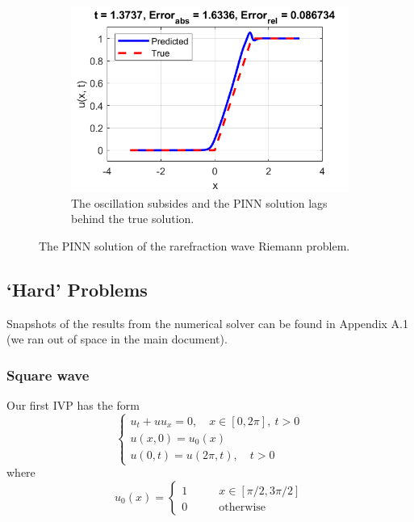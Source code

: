 \documentclass{myproject}
\begin{document}
\begin{figure}
\begin{subfigure}{.48\textwidth}
        \includegraphics[width=1\textwidth]{t137_NN_rarefraction.png}
        \caption{The oscillation subsides and the PINN solution lags behind the true solution.}
    \end{subfigure}
    \caption{The PINN solution of the rarefraction wave Riemann problem.}
\end{figure}








\subsection{`Hard' Problems}
Snapshots of the results from the numerical solver can be found in Appendix A.1 (we ran out of space in the main document).
\subsubsection{Square wave}

Our first IVP has the form
\begin{equation}\label{square_wave}
    \begin{cases}
        u_t + uu_x = 0, \quad x \in [0, 2\pi], \: t>0 \\
        u(x,0) = u_0(x) \\
        u(0,t) = u(2\pi,t), \quad t > 0
    \end{cases}
\end{equation}
where
\begin{equation}
    u_0(x) = 
    \begin{cases}
        1 \qquad &  x \in [\pi/2, 3\pi/2] \\
        0 \qquad & \text{otherwise} 
    \end{cases}
\end{equation}
\end{document}
